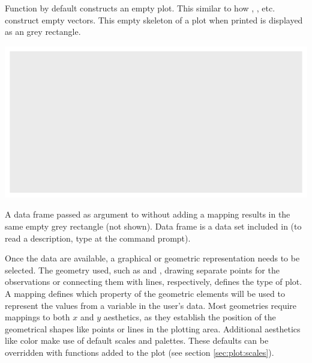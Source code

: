 \documentclass[krantz2]{krantz}\usepackage{knitr}
\begin{document}
Function  by default constructs an empty plot. This similar to how , , etc. construct empty vectors. This empty skeleton of a plot when printed is displayed as an grey rectangle.

\begin{knitrout}\footnotesize
{}\color{fgcolor}\begin{kframe}
\begin{alltt}
\hlstd{()}
\end{alltt}
\end{kframe}

{\centering \includegraphics[width=.7\textwidth]{figure/pos-ggplot-basics-01-1} 

}


\end{knitrout}

A data frame passed as argument to  without adding a mapping results in the same empty grey rectangle (not shown). Data frame  is a data set included in \Rlang (to read a description, type  at the \Rlang command prompt).

\begin{knitrout}\footnotesize
{}\color{fgcolor}\begin{kframe}
\begin{alltt}
\hlstd{(} 
\end{alltt}
\end{kframe}
\end{knitrout}

Once the data are available, a graphical or geometric representation needs to be selected. The geometry used, such as  and , drawing separate points for the observations or connecting them with lines, respectively, defines the type of plot. A mapping defines which property of the geometric elements will be used to represent the values from a variable in the user's data. Most geometries require mappings to both $x$ and $y$ aesthetics, as they establish the position of the geometrical shapes like points or lines in the plotting area. Additional aesthetics like color make use of default scales and palettes. These defaults can be overridden with  functions added to the plot (see section \ref{sec:plot:scales}).
\end{document}
